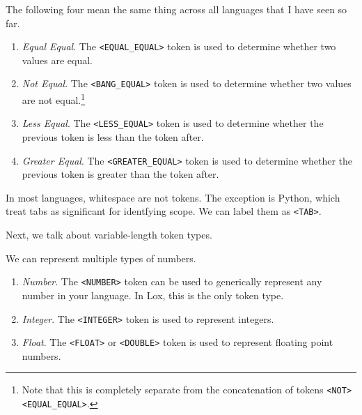   \begin{example}
    \label{ex:equal-equal-not-equal-less-equal-greater-equal}
    The following four mean the same thing across all languages that I have seen so far. 
    \begin{enumerate}
      \item \textit{Equal Equal}. The \texttt{<EQUAL\_EQUAL>} token is used to determine whether two values are equal. 
      \item \textit{Not Equal}. The \texttt{<BANG\_EQUAL>} token is used to determine whether two values are not equal.\footnote{Note that this is completely separate from the concatenation of tokens \texttt{<NOT><EQUAL\_EQUAL>}.} 
      \item \textit{Less Equal}. The \texttt{<LESS\_EQUAL>} token is used to determine whether the previous token is less than the token after. 
      \item \textit{Greater Equal}. The \texttt{<GREATER\_EQUAL>} token is used to determine whether the previous token is greater than the token after. 
    \end{enumerate}
  \end{example}

  \begin{example}[Whitespace]
    \label{ex:whitespace}
    In most languages, whitespace are not tokens. The exception is Python, which treat tabs as significant for identfying scope. We can label them as \texttt{<TAB>}.
  \end{example}

  Next, we talk about variable-length token types. 

  \begin{example}[Identifiers]
    \label{ex:identifiers}
    
  \end{example}

  \begin{example}[String]
    \label{ex:string}
    
  \end{example}

  \begin{example}[Numbers]
    \label{ex:numbers}
    We can represent multiple types of numbers. 
    \begin{enumerate}
      \item \textit{Number}. The \texttt{<NUMBER>} token can be used to generically represent any number in your language. In Lox, this is the only token type. 
      \item \textit{Integer}. The \texttt{<INTEGER>} token is used to represent integers. 
      \item \textit{Float}. The \texttt{<FLOAT>} or \texttt{<DOUBLE>} token is used to represent floating point numbers. 
    \end{enumerate}
  \end{example}

